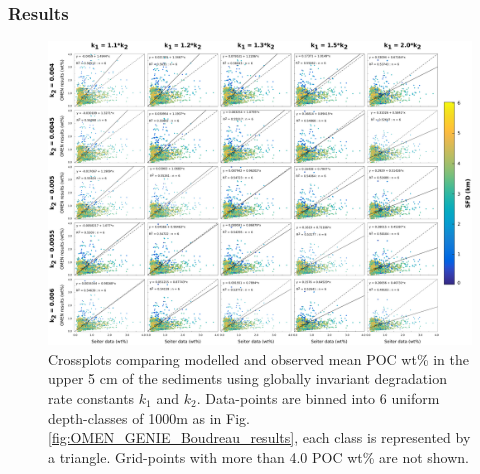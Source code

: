 \documentclass[gmd, manuscript]{copernicus}
\begin{document}
\subsubsection{Results}\label{subsubsec:couplingresultscrossplots}
\begin{figure}[htbp]
\begin{center}
	\includegraphics[width=1.0\textwidth]{figures/OMEN-GENIE-Exp/0_2908_Invariant_k_CROSSPLOT_WITH_REGRESSION.pdf}
	\caption{Crossplots comparing modelled and observed mean POC wt\% in the upper 5 cm of the sediments using globally invariant degradation rate constants $k_1$ and $k_2$. 
	Data-points are binned into 6 uniform depth-classes of 1000m as in Fig. \ref{fig:OMEN_GENIE_Boudreau_results}, each class is represented by a triangle. 
	Grid-points with more than 4.0 POC wt\% are not shown.}\label{fig:OMEN_GENIE_invariant_results}
\end{center}
\end{figure}
\end{document}
